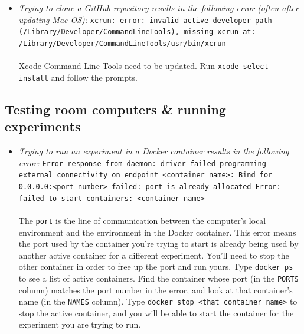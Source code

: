 \documentclass{tufte-book} %
\begin{document}
\begin{itemize}
\item \textit{Trying to clone a GitHub repository results in the following error (often after updating Mac OS): } \linebreak
{\tt xcrun: error: invalid active developer path \linebreak
(/Library/Developer/CommandLineTools), missing xcrun at: /Library/Developer/CommandLineTools/usr/bin/xcrun}
\\~\\
Xcode Command-Line Tools need to be updated.  Run \linebreak
{\tt xcode-select ---install} and follow the prompts.

\end{itemize}

\subsection{Testing room computers \& running experiments}

\begin{itemize}
\item \textit{Trying to run an experiment in a Docker container results in the following error:} \linebreak
{\tt Error response from daemon: driver failed programming external connectivity on endpoint <container name>: Bind for 0.0.0.0:<port number> failed: port is already allocated \linebreak
Error: failed to start containers: <container name>}
\\~\\
The {\tt port} is the line of communication between the computer's local environment and the environment in the Docker container. This error means the port used by the container you're trying to start is already being used by another active container for a different experiment. You'll need to stop the other container in order to free up the port and run yours. Type {\tt docker ps} to see a list of active containers. Find the container whose port (in the {\tt PORTS} column) matches the port number in the error, and look at that container's name (in the {\tt NAMES} column). Type {\tt docker stop \textless that\_container\_name\textgreater} to stop the active container, and you will be able to start the container for the experiment you are trying to run.

\end{itemize}
\end{document}
